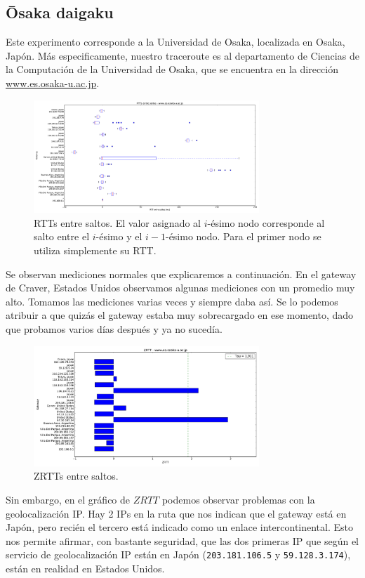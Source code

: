 \subsection{Ōsaka daigaku}

Este experimento corresponde a la Universidad de Osaka, localizada en Osaka, Japón. Más especificamente, nuestro traceroute es al departamento de Ciencias de la Computación de la Universidad de Osaka, que se encuentra en la dirección \url{www.es.osaka-u.ac.jp}.

\begin{figure}[H]
    \centering
    \includegraphics[width=8.5cm]{img/grafico1-www-es-osaka-u-ac-jp.pdf}
    \caption{\normalfont RTTs entre saltos. El valor asignado al $i$-ésimo nodo corresponde al salto entre el $i$-ésimo y el $i - 1$-ésimo nodo. Para el primer nodo se utiliza simplemente su RTT.}
\end{figure}

Se observan mediciones normales que explicaremos a continuación. En el gateway de Craver, Estados Unidos observamos algunas mediciones con un promedio muy alto. Tomamos las mediciones varias veces y siempre daba así. Se lo podemos atribuir a que quizás el gateway estaba muy sobrecargado en ese momento, dado que probamos varios días después y ya no sucedía.

\begin{figure}[H]
    \centering
    \includegraphics[width=8.5cm]{img/grafico2-www-es-osaka-u-ac-jp.pdf}
    \caption{\normalfont ZRTTs entre saltos.}
\end{figure}

Sin embargo, en el gráfico de $ZRTT$ podemos observar problemas con la geolocalización IP. Hay 2 IPs en la ruta que nos indican que el gateway está en Japón, pero recién el tercero está indicado como un enlace intercontinental.
Esto nos permite afirmar, con bastante seguridad, que las dos primeras IP que según el servicio de geolocalización IP están en Japón (\texttt{203.181.106.5} y \texttt{59.128.3.174}), están en realidad en Estados Unidos.

